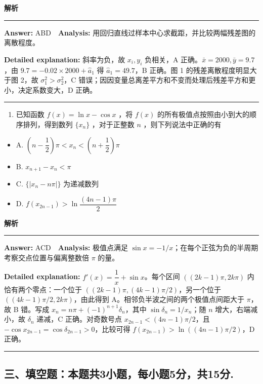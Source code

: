 \documentclass[UTF8,12pt,a4paper]{ctexart}
\renewcommand{\labelenumi}{\arabic{enumi}.}
\newenvironment{examSolutionBox}{%
  \par\medskip\begingroup
  \setlength{\leftskip}{1.0em}\setlength{\rightskip}{0.9em}%
  \noindent\textcolor{SolutionTeal}{\bfseries\large 解析}\par
  \smallskip\noindent\textcolor{SolutionRule}{\rule{\dimexpr\linewidth-\leftskip-\rightskip\relax}{0.8pt}}\par
  \smallskip\color{SolutionInk}%
}{%
  \par\smallskip\noindent\textcolor{SolutionRule}{\rule{\dimexpr\linewidth-\leftskip-\rightskip\relax}{0.8pt}}\par
  \endgroup\medskip
}
\providecommand{\tightlist}{%
  \setlength{\itemsep}{0pt}\setlength{\parskip}{0pt}}
\begin{document}
\begin{examSolutionBox}

\textbf{Answer:} ABD　\textbf{Analysis:} 用回归直线过样本中心求截距，并比较两幅残差图的离散程度。

\textbf{Detailed explanation:} 斜率为负，故 \(x_i,y_i\) 负相关，A 正确。\(\bar x=2000,\bar y=9.7\)，由 \(9.7=-0.02\times2000+\hat a_1\) 得 \(\hat a_1=49.7\)，B 正确。图 1 的残差离散程度明显大于图 2，故 \(\sigma_1^2>\sigma_2^2\)，C 错误；因因变量总离差平方和不变而处理后残差平方和更小，决定系数变大，D 正确。

\end{examSolutionBox}

\begin{enumerate}
\def\labelenumi{\arabic{enumi}.}
\setcounter{enumi}{10}
\tightlist
\item
  已知函数 \(f(x) = \ln x - \cos x\) ，将 \(f(x)\) 的所有极值点按照由小到大的顺序排列，得到数列 \(\{x_n\}\) ，对于正整数 \(n\) ，则下列说法中正确的有
\end{enumerate}

\begin{itemize}
\tightlist
\item
  A. \((n - \dfrac{1}{2})\pi < x_n < (n + \dfrac{1}{2})\pi\)
\item
  B. \(x_{n+1} - x_n < \pi\)
\item
  C. \(\{ |x_n - n\pi | \}\) 为递减数列
\item
  D. \(f(x_{2n-1}) > \ln \dfrac{(4n-1)\pi}{2}\)
\end{itemize}

\begin{examSolutionBox}

\textbf{Answer:} ACD　\textbf{Analysis:} 极值点满足 \(\sin x=-1/x\)；在每个正弦为负的半周期考察交点位置与偏离整数倍 \(\pi\) 的量。

\textbf{Detailed explanation:} \(f'(x)=\dfrac1x+\sin x\)。每个区间 \(((2k-1)\pi,2k\pi)\) 内恰有两个零点：一个位于 \(((2k-1)\pi,(4k-1)\pi/2)\)，另一个位于 \(((4k-1)\pi/2,2k\pi)\)，由此得到 A。相邻负半波之间的两个极值点间距大于 \(\pi\)，故 B 错。写成 \(x_n=n\pi+(-1)^{n+1}\delta_n\)，其中 \(\sin\delta_n=1/x_n\)；随 \(n\) 增大，右端减小，故 \(\delta_n\) 递减，C 正确。对奇数号点 \(x_{2n-1}<(4n-1)\pi/2\)，且 \(-\cos x_{2n-1}=\cos\delta_{2n-1}>0\)，比较可得 \(f(x_{2n-1})>\ln((4n-1)\pi/2)\)，D 正确。

\end{examSolutionBox}

\subsection{三、填空题：本题共3小题，每小题5分，共15分.}\label{ux4e09ux586bux7a7aux9898ux672cux9898ux51713ux5c0fux9898ux6bcfux5c0fux98985ux5206ux517115ux5206.}
\end{document}
